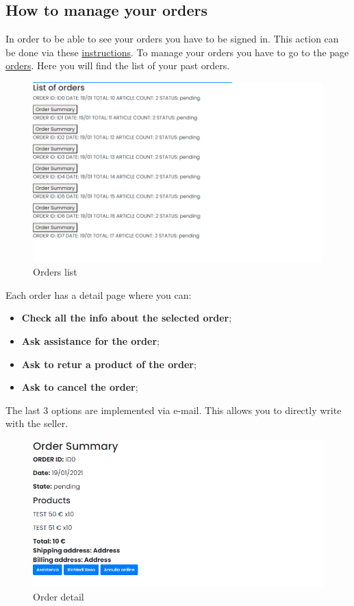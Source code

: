 \subsection{How to manage your orders} \label{_orders}
In order to be able to see your orders you have to be signed in. This action can be done via these \hyperref[_signin]{instructions}.
To manage your orders you have to go to the page \href{https://d28yg0rufs9lo7.cloudfront.net/orders}{orders}. Here you will find the list of your past orders.
\begin{figure}[H]
    \centering
    \includegraphics[width=\linewidth]{res/images/cliente/orders.png}
    \caption{Orders list}
\end{figure}
Each order has a detail page where you can:
\begin{itemize} 
    \item \textbf{Check all the info about the selected order};
    \item \textbf{Ask assistance for the order}; 
    \item \textbf{Ask to retur a product of the order}; 
    \item \textbf{Ask to cancel the order}; 
\end{itemize}
The last 3 options are implemented via e-mail. This allows you to directly write with the seller.
\begin{figure}[H]
    \centering
    \includegraphics[width=\linewidth]{res/images/cliente/order.png}
    \caption{Order detail}
\end{figure}

